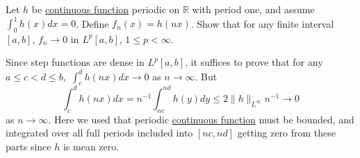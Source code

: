   \begin{exercise}
    Let $h$ be \hyperref[pst-def:continuous_func]{continuous function} periodic on $\mathbb{R}$ with period one, and assume $\int_{0}^{1}h(x)dx=0$. Define $f_{n}(x)=h(nx)$. Show that for any finite interval $[a, b]$, $f_{n}\rightarrow0$ in $L^{p}[a,b]$, $1\le p<\infty$.
  \end{exercise}
  \begin{solution}
    Since step functions are dense in $L^{p}[a,b]$, it suffices to prove that for any $a\le c < d\le b,$ $\int_{c}^{d}h(nx)dx\rightarrow0$ as $n\rightarrow\infty$. But
    \begin{equation}
      \int_{c}^{d}h(nx)dx=n^{-1}\int_{nc}^{nd}h(y)dy\le2\|h\|_{L^{\infty}}n^{-1}\rightarrow0
    \end{equation}
    as $n\rightarrow\infty$. Here we used that periodic \hyperref[pst-def:continuous_func]{continuous function} must be bounded, and integrated over all full periods included into $[nc, nd]$ getting zero from these parts since $h$ is mean zero.
  \end{solution}



